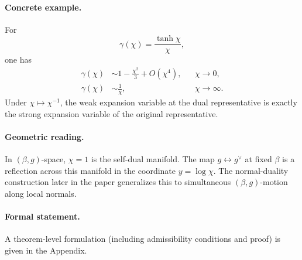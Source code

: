 \paragraph{Concrete example.}
For
\begin{equation}
  \gamma(\chi)=\frac{\tanh\chi}{\chi},
\end{equation}
one has
\begin{align}
  \gamma(\chi) &\sim 1-\frac{\chi^2}{3}+O(\chi^4), && \chi\to0, \\
  \gamma(\chi) &\sim \frac{1}{\chi}, && \chi\to\infty.
\end{align}
Under \(\chi\mapsto\chi^{-1}\), the weak expansion variable at the dual representative is exactly
the strong expansion variable of the original representative.

\paragraph{Geometric reading.}
In \((\beta,g)\)-space, \(\chi=1\) is the self-dual manifold.
The map \(g\leftrightarrow g^\vee\) at fixed \(\beta\) is a reflection across this manifold in the
coordinate \(y=\log\chi\).
The normal-duality construction later in the paper generalizes this to simultaneous
\((\beta,g)\)-motion along local normals.

\paragraph{Formal statement.}
A theorem-level formulation (including admissibility conditions and proof) is given in the Appendix.
